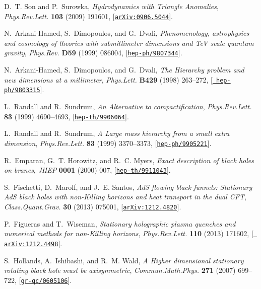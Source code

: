 \documentclass[12pt]{article}
\begin{document}
\begin{thebibliography}{100}
D.~T. Son and P.~Surowka, {\it {Hydrodynamics with Triangle Anomalies}},  {\em
  Phys.Rev.Lett.} {\bf 103} (2009) 191601,
  [\href{http://xxx.lanl.gov/abs/0906.5044}{{\tt arXiv:0906.5044}}].

N.~Arkani-Hamed, S.~Dimopoulos, and G.~Dvali, {\it {Phenomenology, astrophysics
  and cosmology of theories with submillimeter dimensions and TeV scale quantum
  gravity}},  {\em Phys.Rev.} {\bf D59} (1999) 086004,
  [\href{http://xxx.lanl.gov/abs/hep-ph/9807344}{{\tt hep-ph/9807344}}].

N.~Arkani-Hamed, S.~Dimopoulos, and G.~Dvali, {\it {The Hierarchy problem and
  new dimensions at a millimeter}},  {\em Phys.Lett.} {\bf B429} (1998)
  263--272, [\href{http://xxx.lanl.gov/abs/hep-ph/9803315}{{\tt
  hep-ph/9803315}}].

L.~Randall and R.~Sundrum, {\it {An Alternative to compactification}},  {\em
  Phys.Rev.Lett.} {\bf 83} (1999) 4690--4693,
  [\href{http://xxx.lanl.gov/abs/hep-th/9906064}{{\tt hep-th/9906064}}].

L.~Randall and R.~Sundrum, {\it {A Large mass hierarchy from a small extra
  dimension}},  {\em Phys.Rev.Lett.} {\bf 83} (1999) 3370--3373,
  [\href{http://xxx.lanl.gov/abs/hep-ph/9905221}{{\tt hep-ph/9905221}}].

R.~Emparan, G.~T. Horowitz, and R.~C. Myers, {\it {Exact description of black
  holes on branes}},  {\em JHEP} {\bf 0001} (2000) 007,
  [\href{http://xxx.lanl.gov/abs/hep-th/9911043}{{\tt hep-th/9911043}}].

S.~Fischetti, D.~Marolf, and J.~E. Santos, {\it {AdS flowing black funnels:
  Stationary AdS black holes with non-Killing horizons and heat transport in
  the dual CFT}},  {\em Class.Quant.Grav.} {\bf 30} (2013) 075001,
  [\href{http://xxx.lanl.gov/abs/1212.4820}{{\tt arXiv:1212.4820}}].

P.~Figueras and T.~Wiseman, {\it {Stationary holographic plasma quenches and
  numerical methods for non-Killing horizons}},  {\em Phys.Rev.Lett.} {\bf 110}
  (2013) 171602, [\href{http://xxx.lanl.gov/abs/1212.4498}{{\tt
  arXiv:1212.4498}}].

S.~Hollands, A.~Ishibashi, and R.~M. Wald, {\it {A Higher dimensional
  stationary rotating black hole must be axisymmetric}},  {\em
  Commun.Math.Phys.} {\bf 271} (2007) 699--722,
  [\href{http://xxx.lanl.gov/abs/gr-qc/0605106}{{\tt gr-qc/0605106}}].


\end{thebibliography}
\end{document}

